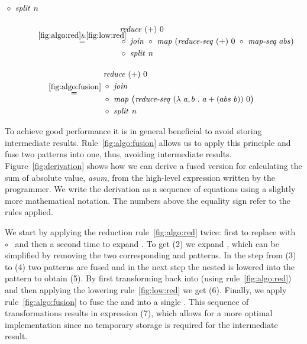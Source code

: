 \begin{figure*}[t]
\begin{align}
\begin{aligned}
        &\circ\ \MySplit\ n
      \end{aligned}\\[1em]
  & \overset{\hspace{-1.3em}\ref{fig:algo:red}\& \ref{fig:low:red}\hspace{-1.1em}}{=\hspace{.2em}}
      \begin{aligned}
        & \Reduce\ (+)\ 0\\
        &\circ\ \MyJoin\ \circ\ \Map\ (\RedSeq\ (+)\ 0\ \circ\ \MapSeq\ abs)\\
        &\circ\ \MySplit\ n
      \end{aligned}\\[1em]
  & \overset{\ref{fig:algo:fusion}}{=\hspace{.2em}}
      \begin{aligned}
        & \Reduce\ (+)\ 0\\
        &\circ\ \MyJoin\\
        &\circ\ \Map\ \big(\RedSeq\ (\lambda\ a, b\ .\ a+(abs\ b))\ 0\big)\\
        &\circ\ \MySplit\ n
      \end{aligned}
\end{align}
\vspace{-2em}
\caption{Derivation for \emph{asum}$(\vec{x})$ to a fused parallel version.
  The numbers above the equality sign refer to the rules from sections ....
}
\label{fig:derivation}
\end{figure*}




To achieve good performance it is in general beneficial to avoid storing intermediate results.
Rule~\ref{fig:algo:fusion} allows us to apply this principle and fuse two patterns into one, thus, avoiding intermediate results.
Figure~\ref{fig:derivation} shows how we can derive a fused version for calculating the sum of absolute value, \emph{asum}, from the high-level expression written by the programmer.
We write the derivation as a sequence of equations using a slightly more mathematical notation.
The numbers above the equality sign refer to the rules applied.

We start by applying the reduction rule~\ref{fig:algo:red} twice:
first to replace  with ~$\circ$~ and then a second time to expand .
To get (2) we expand , which can be simplified by removing the two corresponding  and  patterns.
In the step from (3) to (4) two  patterns are fused and in the next step the nested  is lowered into the  pattern to obtain (5).
By first transforming  back into  (using rule~\ref{fig:algo:red}) and then applying the lowering rule~\ref{fig:low:red} we get (6).
Finally, we apply rule~\ref{fig:algo:fusion} to fuse the  and  into a single .
This sequence of transformations results in expression (7), which allows for a more optimal implementation since no temporary storage is required for the intermediate result.



